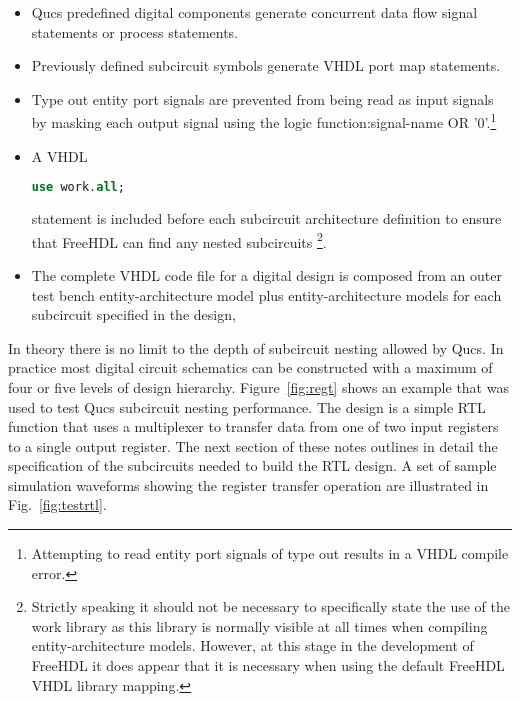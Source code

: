 \begin{itemize}
\item
Qucs predefined digital components generate concurrent data flow
signal statements or process statements.
\item
Previously defined subcircuit symbols generate VHDL port map
statements.
\item
 Type out entity port signals are prevented from being read as input
 signals by masking each output signal using the logic
 function:\linebreak signal-name OR '0'.\footnote{Attempting to read
 entity port signals of type out results in a VHDL compile error. }
\item
 A VHDL \begin{lstlisting}[language=VHDL]
use work.all; \end{lstlisting}
statement is included before each subcircuit architecture definition
to ensure that FreeHDL can find any nested subcircuits
\footnote{Strictly speaking it should not be necessary to specifically
state the use of the work library as this library is normally visible
at all times when compiling entity-architecture models.  However, at
this stage in the development of FreeHDL it does appear that it is
necessary when using the default FreeHDL VHDL library mapping.}.
\item
The complete VHDL code file for a digital design is composed from an
outer test bench entity-architecture model plus entity-architecture
models for each subcircuit specified in the design,
\end{itemize}


In theory there is no limit to the depth of subcircuit nesting allowed
by Qucs.  In practice most digital circuit schematics can be
constructed with a maximum of four or five levels of design hierarchy.
Figure~\ref{fig:regt} shows an example that was used to test Qucs
subcircuit nesting performance.  The design is a simple RTL function
that uses a multiplexer to transfer data from one of two input
registers to a single output register.  The next section of these
notes outlines in detail the specification of the subcircuits needed
to build the RTL design.  A set of sample simulation waveforms showing
the register transfer operation are illustrated in
Fig.~\ref{fig:testrtl}.


